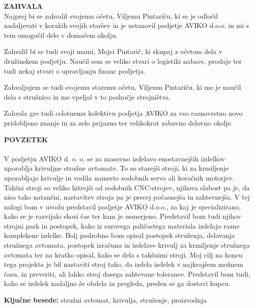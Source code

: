 \newpage
\textbf{\fontsize{14}{21}\selectfont ZAHVALA} \\
Najprej bi se zahvalil svojemu očetu, Viljemu Pintariču,
ki se je odločil nadaljevati v korakih svojih staršev in
je ustanovil podjetje AVIKO d.o.o. in mi s tem omogočil delo
v domačem okolju.

Zahvalil bi se tudi svoji mami, Mojci Pintarič, ki skupaj z očetom
dela v družinskem podjetju. Naučil sem se veliko stvari o
logistiki nabave, prodaje ter tudi nekaj stvari o upravljanju
financ podjetja.

Zahvaljujem se tudi svojemu staremu očetu, Viljemu Pintariču,
ki me je naučil dela s stružnico in me vpeljal v to področje strojništva.

Zahvala gre tudi celotnemu kolektivu podjetja AVIKO za vso
raznovrstno novo pridobljeno znanje in za zelo prijazno ter velikokrat
zabavno delovno okolje.

\newpage
\textbf{\fontsize{14}{21}\selectfont POVZETEK} \\
\\
V podjetju AVIKO d. o. o. se za masovno izdelavo enostavnejših
izdelkov uporablja krivuljne stružne avtomate. To so starejši
stroji, ki za krmiljenje uporabljajo krivulje in vodila namesto
sodobnih servo ali koračnih motorjev. Takšni stroji so veliko
hitrejši od sodobnih CNC-strojev, njihova slabost pa je, da niso
tako natančni, nastavitev stroja pa je precej počasnejša in zahtevnejša.
V tej nalogi bom v uvodu predstavil podjetje AVIKO d.o.o.,
za kaj je specializirano, kako se je razvijalo skozi
čas ter kam je usmerjeno. Predstavil bom tudi njihov strojni
park in postopek, kako iz surovega paličastega materiala
izdelajo razne kompleksne izdelke.
Bolj podrobno bom opisal postopek struženja, delovanja
stružnega avtomata, postopek
izračuna in izdelave krivulj za krmiljenje stružnega avtomata ter na kratko opisal, kako se dela s takšnimi stroji.
Moj cilj na koncu tega projekta je bil
nastaviti stroj tako, da izdela
izdelek v najkrajšem možnem času, in preveriti, ali lahko stroj
dosega zahtevane tolerance. Predstavil bom tudi, kako se
izdelek nadaljno še obdela in pregleda, preden se ga dostavi kupcu.

\textbf{\fontsize{14}{21}\selectfont Ključne besede:}
\fontsize{12}{16}stružni avtomat, krivulja, struženje, proizvodnja

